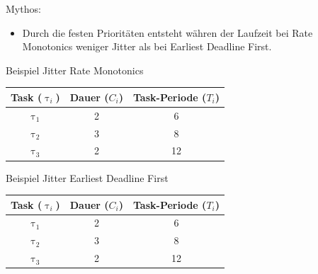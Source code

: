 \begin{frame}{\subsecname}
	Mythos:
	\begin{itemize}
		\item Durch die festen Prioritäten entsteht währen der Laufzeit bei Rate Monotonics weniger Jitter als bei Earliest Deadline First. 
	\end{itemize}
\end{frame}

\newcommand{\showRMSlideJit}[1] {\begin{frame}{Beispiel Jitter Rate Monotonics}
		\begin{center}
		\begin{tabular}{c||c|c}
			Task ($\uptau_i$) & Dauer ($C_i$) & Task-Periode ($T_i$)\\\hline\hline
			$\uptau_1$ & 2 & 6\\
			$\uptau_2$ & 3 & 8\\
			$\uptau_3$ & 2 & 12
		\end{tabular}
	\end{center}
	
\end{frame}}

%
{%
	\showRMSlideJit{\arabic{ct}}
}

\begin{frame}{Beispiel Jitter Earliest Deadline First}
		\begin{center}
		\begin{tabular}{c||c|c}
			Task ($\uptau_i$) & Dauer ($C_i$) & Task-Periode ($T_i$)\\\hline\hline
			$\uptau_1$ & 2 & 6\\
			$\uptau_2$ & 3 & 8\\
			$\uptau_3$ & 2 & 12
		\end{tabular}
	\end{center}
	
\end{frame}

